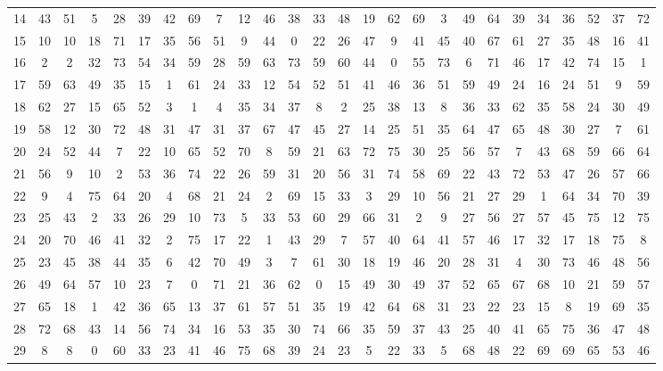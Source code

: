 \begin{table}
\begin{tabular}{c c c c c c c c c c c c c c c c c c c c c c c c c c }
14 & 43 & 51 & 5 & 28 & 39 & 42 & 69 & 7 & 12 & 46 & 38 & 33 & 48 & 19 & 62 & 69 & 3 & 49 & 64 & 39 & 34 & 36 & 52 & 37 & 72 \\
15 & 10 & 10 & 18 & 71 & 17 & 35 & 56 & 51 & 9 & 44 & 0 & 22 & 26 & 47 & 9 & 41 & 45 & 40 & 67 & 61 & 27 & 35 & 48 & 16 & 41 \\
16 & 2 & 2 & 32 & 73 & 54 & 34 & 59 & 28 & 59 & 63 & 73 & 59 & 60 & 44 & 0 & 55 & 73 & 6 & 71 & 46 & 17 & 42 & 74 & 15 & 1 \\
17 & 59 & 63 & 49 & 35 & 15 & 1 & 61 & 24 & 33 & 12 & 54 & 52 & 51 & 41 & 46 & 36 & 51 & 59 & 49 & 24 & 16 & 24 & 51 & 9 & 59 \\
18 & 62 & 27 & 15 & 65 & 52 & 3 & 1 & 4 & 35 & 34 & 37 & 8 & 2 & 25 & 38 & 13 & 8 & 36 & 33 & 62 & 35 & 58 & 24 & 30 & 49 \\
19 & 58 & 12 & 30 & 72 & 48 & 31 & 47 & 31 & 37 & 67 & 47 & 45 & 27 & 14 & 25 & 51 & 35 & 64 & 47 & 65 & 48 & 30 & 27 & 7 & 61 \\
20 & 24 & 52 & 44 & 7 & 22 & 10 & 65 & 52 & 70 & 8 & 59 & 21 & 63 & 72 & 75 & 30 & 25 & 56 & 57 & 7 & 43 & 68 & 59 & 66 & 64 \\
21 & 56 & 9 & 10 & 2 & 53 & 36 & 74 & 22 & 26 & 59 & 31 & 20 & 56 & 31 & 74 & 58 & 69 & 22 & 43 & 72 & 53 & 47 & 26 & 57 & 66 \\
22 & 9 & 4 & 75 & 64 & 20 & 4 & 68 & 21 & 24 & 2 & 69 & 15 & 33 & 3 & 29 & 10 & 56 & 21 & 27 & 29 & 1 & 64 & 34 & 70 & 39 \\
23 & 25 & 43 & 2 & 33 & 26 & 29 & 10 & 73 & 5 & 33 & 53 & 60 & 29 & 66 & 31 & 2 & 9 & 27 & 56 & 27 & 57 & 45 & 75 & 12 & 75 \\
24 & 20 & 70 & 46 & 41 & 32 & 2 & 75 & 17 & 22 & 1 & 43 & 29 & 7 & 57 & 40 & 64 & 41 & 57 & 46 & 17 & 32 & 17 & 18 & 75 & 8 \\
25 & 23 & 45 & 38 & 44 & 35 & 6 & 42 & 70 & 49 & 3 & 7 & 61 & 30 & 18 & 19 & 46 & 20 & 28 & 31 & 4 & 30 & 73 & 46 & 48 & 56 \\
26 & 49 & 64 & 57 & 10 & 23 & 7 & 0 & 71 & 21 & 36 & 62 & 0 & 15 & 49 & 30 & 49 & 37 & 52 & 65 & 67 & 68 & 10 & 21 & 59 & 57 \\
27 & 65 & 18 & 1 & 42 & 36 & 65 & 13 & 37 & 61 & 57 & 51 & 35 & 19 & 42 & 64 & 68 & 31 & 23 & 22 & 23 & 15 & 8 & 19 & 69 & 35 \\
28 & 72 & 68 & 43 & 14 & 56 & 74 & 34 & 16 & 53 & 35 & 30 & 74 & 66 & 35 & 59 & 37 & 43 & 25 & 40 & 41 & 65 & 75 & 36 & 47 & 48 \\
29 & 8 & 8 & 0 & 60 & 33 & 23 & 41 & 46 & 75 & 68 & 39 & 24 & 23 & 5 & 22 & 33 & 5 & 68 & 48 & 22 & 69 & 69 & 65 & 53 & 46 \\

\end{tabular}
\end{table}
